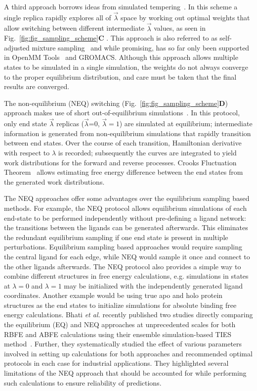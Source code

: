 \documentclass[9pt,bestpractices]{livecoms}
\begin{document}
A third approach borrows ideas from simulated tempering~\cite{marinari1992simulated}. In this scheme a single replica rapidly explores all of $\vec{\lambda}$ space by working out optimal weights that allow switching between different intermediate $\vec{\lambda}$ values, as seen in Fig.~\ref{fig:fig_sampling_scheme}\textbf{C} . This approach is also referred to as self-adjusted mixture sampling~\cite{lyubartsev1992new, li2007simulated, tan2017optimally} and while promising, has so far only been supported in OpenMM Tools~\cite{andrearizzi2019choderalab} and GROMACS.  Although this approach allows multiple states to be simulated in a single simulation, the weights do not always converge to the proper equilibrium distribution, and care must be taken that the final results are converged. 

The non-equilibrium (NEQ) switching (Fig.~\ref{fig:fig_sampling_scheme}\textbf{D}) approach makes use of short out-of-equilibrium simulations~\cite{aldeghi2018accurate}. In this protocol, only end state $\vec{\lambda}$ replicas ($\vec{\lambda}$=0, $\vec{\lambda}=1$) are simulated at equilibrium; intermediate information is generated from non-equilibrium simulations that rapidly transition between end states. 
Over the course of each transition, Hamiltonian derivative with respect to $\lambda$ is recorded; subsequently the curves are integrated to yield work distributions for the forward and reverse processes. Crooks Fluctuation Theorem~\cite{crooks1999entropy} allows estimating free energy difference between the end states from the generated work distributions.~\cite{shirts2003equilibrium}

The NEQ approaches offer some advantages over the equilibrium sampling based methods. For example, the NEQ protocol allows equilibrium simulations of each end-state to be performed independently without pre-defining a ligand network: the transitions between the ligands can be generated afterwards. This eliminates the redundant equilibrium sampling if one end state is present in multiple perturbations. Equilibrium sampling based approaches would require sampling the central ligand for each edge, while NEQ would sample it once and connect to the other ligands afterwards. The NEQ protocol also provides a simple way to combine different structures in free energy calculations, e.g. simulations in states at $\lambda=0$ and $\lambda=1$ may be initialized with the independently generated ligand coordinates. Another example would be using true apo and holo protein structures as the end states to initialize simulations for absolute binding free energy calculations. 
Bhati \textit{et al.} recently published two studies directly comparing the equilibrium (EQ) and NEQ approaches at unprecedented scales for both RBFE and ABFE calculations using their ensemble simulation-based TIES method~\cite{wan2023eqvsneq, bhati2025}. Further, they systematically studied the effect of various parameters involved in setting up calculations for both approaches and recommended optimal protocols in each case for industrial applications. They highlighted several limitations of the NEQ approach that should be accounted for while performing such calculations to ensure reliability of predictions.
\end{document}
